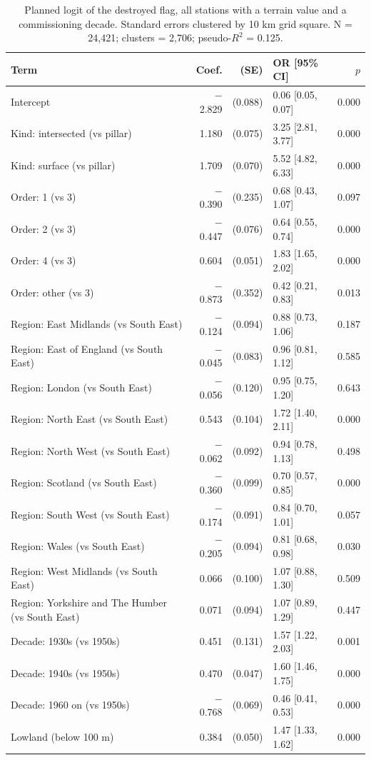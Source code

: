 \documentclass[11pt,a4paper]{article}
\begin{document}
\begin{table}[tbp]\centering\scriptsize\caption{Planned logit of the destroyed flag, all stations with a terrain value and a commissioning decade. Standard errors clustered by 10 km grid square. N = 24,421; clusters = 2,706; pseudo-$R^2$ = 0.125.}\label{tab:logit}\begin{tabular}{p{7.2cm}rrlr}\toprule Term & Coef. & (SE) & OR [95\% CI] & $p$\\\midrule
Intercept & $-$2.829 & (0.088) & 0.06 [0.05, 0.07] & 0.000\\
Kind: intersected (vs pillar) & 1.180 & (0.075) & 3.25 [2.81, 3.77] & 0.000\\
Kind: surface (vs pillar) & 1.709 & (0.070) & 5.52 [4.82, 6.33] & 0.000\\
Order: 1 (vs 3) & $-$0.390 & (0.235) & 0.68 [0.43, 1.07] & 0.097\\
Order: 2 (vs 3) & $-$0.447 & (0.076) & 0.64 [0.55, 0.74] & 0.000\\
Order: 4 (vs 3) & 0.604 & (0.051) & 1.83 [1.65, 2.02] & 0.000\\
Order: other (vs 3) & $-$0.873 & (0.352) & 0.42 [0.21, 0.83] & 0.013\\
Region: East Midlands (vs South East) & $-$0.124 & (0.094) & 0.88 [0.73, 1.06] & 0.187\\
Region: East of England (vs South East) & $-$0.045 & (0.083) & 0.96 [0.81, 1.12] & 0.585\\
Region: London (vs South East) & $-$0.056 & (0.120) & 0.95 [0.75, 1.20] & 0.643\\
Region: North East (vs South East) & 0.543 & (0.104) & 1.72 [1.40, 2.11] & 0.000\\
Region: North West (vs South East) & $-$0.062 & (0.092) & 0.94 [0.78, 1.13] & 0.498\\
Region: Scotland (vs South East) & $-$0.360 & (0.099) & 0.70 [0.57, 0.85] & 0.000\\
Region: South West (vs South East) & $-$0.174 & (0.091) & 0.84 [0.70, 1.01] & 0.057\\
Region: Wales (vs South East) & $-$0.205 & (0.094) & 0.81 [0.68, 0.98] & 0.030\\
Region: West Midlands (vs South East) & 0.066 & (0.100) & 1.07 [0.88, 1.30] & 0.509\\
Region: Yorkshire and The Humber (vs South East) & 0.071 & (0.094) & 1.07 [0.89, 1.29] & 0.447\\
Decade: 1930s (vs 1950s) & 0.451 & (0.131) & 1.57 [1.22, 2.03] & 0.001\\
Decade: 1940s (vs 1950s) & 0.470 & (0.047) & 1.60 [1.46, 1.75] & 0.000\\
Decade: 1960 on (vs 1950s) & $-$0.768 & (0.069) & 0.46 [0.41, 0.53] & 0.000\\
Lowland (below 100 m) & 0.384 & (0.050) & 1.47 [1.33, 1.62] & 0.000\\
\bottomrule\end{tabular}\end{table}
\end{document}
